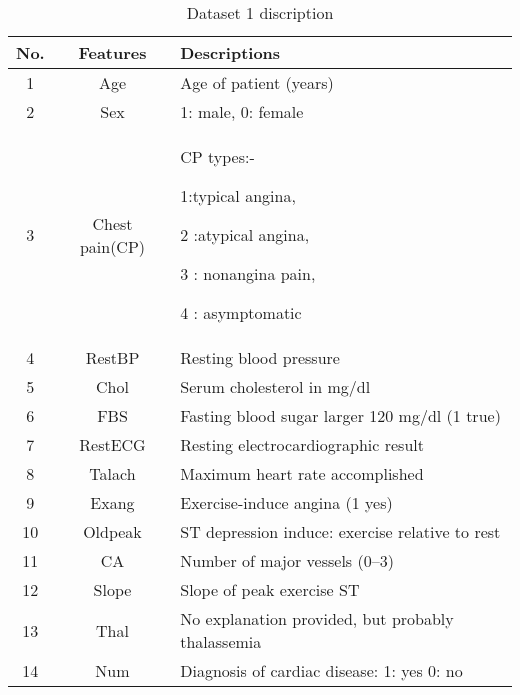 \documentclass[11pt]{article}
\begin{document}
\begin{table}[H]
\caption{Dataset 1 discription}

\vspace{0.3cm}
\centering
\def\arraystretch{0.9}
\begin{tabular}{|c|c|p{12cm}|}

\hline
No. & Features &        Descriptions\\ \hline
1   &    Age       &    Age of patient (years)\\ \hline
2    &   Sex      &     1: male, 0: female\\ \hline
3    &  Chest pain(CP) &   CP types:-

						1:typical angina,
						
                         2 :atypical angina,
                         
                         3 : nonangina pain,
                         
                         4 : asymptomatic\\ \hline
4 	&   RestBP 	&	  Resting blood pressure\\ \hline
5 	&  Chol 		 &     Serum cholesterol in mg/dl\\ \hline
6 	&   FBS 		&	Fasting blood sugar larger 120 mg/dl (1 true)\\ \hline
7 	&   RestECG   &    Resting electrocardiographic result\\ \hline
8 	&  Talach    &      Maximum heart rate accomplished\\ \hline
9 	&  Exang 	&		 Exercise-induce angina (1 yes)\\ \hline
10 	&  Oldpeak 	&	 ST depression induce: exercise relative to rest\\ \hline
11 	&  CA 	      &    Number of major vessels (0–3)\\ \hline
12 	&  Slope 	 &         Slope of peak exercise ST\\ \hline
13 	&  Thal 		&	  No explanation provided, but probably thalassemia\\ \hline
14 	&   Num      &      Diagnosis of cardiac disease:
					   1: yes
	                    0: no\\
\hline                    


\end{tabular}
\label{tab:data1}

\end{table}
\end{document}
